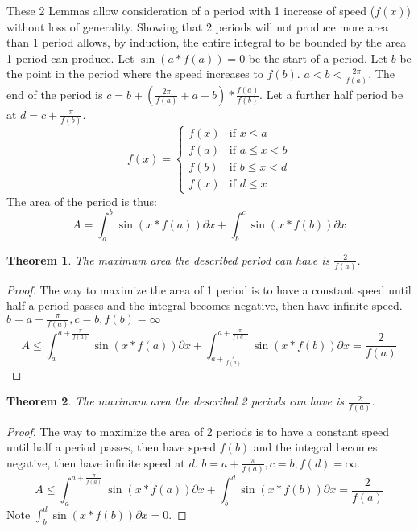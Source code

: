 \documentclass[]{article}
\newcommand{\pqty}[1]{{\left(#1\right)}}
\newtheorem{theorem}{Theorem}[section]
\numberwithin{equation}{section}
\begin{document}
	These 2 Lemmas allow consideration of a period with 1 increase of speed (\(f\pqty{x}\)) without loss of generality. Showing that 2 periods will not produce more area than 1 period allows, by induction, the entire integral to be bounded by the area 1 period can produce.
	Let \(\sin\pqty{a*f\pqty{a}}=0\) be the start of a period. Let \(b\) be the point in the period where the speed increases to \(f\pqty{b}\). \(a<b<\frac{2\pi}{f\pqty{a}}\). The end of the period is \(c=b + \pqty{\frac{2\pi}{f\pqty{a}} + a - b}*\frac{f\pqty{a}}{f\pqty{b}}\). Let a further half period be at \(d=c+\frac{\pi}{f\pqty{b}}\).
	\begin{equation}
	f\pqty{x}=
	\begin{cases}
	f\pqty{x} & \text{if } x \leq a\\
	f\pqty{a} & \text{if } a \leq x < b\\
	f\pqty{b} & \text{if } b \leq x < d\\
	f\pqty{x} & \text{if } d \leq x
	\end{cases}
	\end{equation}
	The area of the period is thus:
	\begin{equation}
	A=
	\int_{a}^{b}\sin\pqty{x*f\pqty{a}}\partial x+
	\int_{b}^{c}\sin\pqty{x*f\pqty{b}}\partial x
	\end{equation}
	
	\begin{theorem}
		The maximum area the described period can have is \(\frac{2}{f\pqty{a}}\).
	\end{theorem}
	\begin{proof}
		The way to maximize the area of 1 period is to have a constant speed until half a period passes and the integral becomes negative, then have infinite speed. \(b=a+\frac{\pi}{f\pqty{a}},c=b,f\pqty{b}=\infty\)
		\begin{equation}
		A \leq \int_{a}^{a+\frac{\pi}{f\pqty{a}}}\sin\pqty{x*f\pqty{a}}\partial x
		+\int_{a+\frac{\pi}{f\pqty{a}}}^{a+\frac{\pi}{f\pqty{a}}}\sin\pqty{x*f\pqty{b}}\partial x
		=\frac{2}{f\pqty{a}}
		\end{equation}
	\end{proof}
	\begin{theorem}
	The maximum area the described 2 periods can have is \(\frac{2}{f\pqty{a}}\).
	\end{theorem}
	\begin{proof}
	The way to maximize the area of 2 periods is to have a constant speed until half a period passes, then have speed \(f\pqty{b}\) and the integral becomes negative, then have infinite speed at \(d\). \(b=a+\frac{\pi}{f\pqty{a}},c=b,f\pqty{d}=\infty\).
	\begin{equation}
	A \leq \int_{a}^{a+\frac{\pi}{f\pqty{a}}}\sin\pqty{x*f\pqty{a}}\partial x
	+\int_{b}^{d}\sin\pqty{x*f\pqty{b}}\partial x
	=\frac{2}{f\pqty{a}}
	\end{equation}
	Note \(\int_{b}^{d}\sin\pqty{x*f\pqty{b}}\partial x=0\).
	\end{proof}
	
\end{document}
